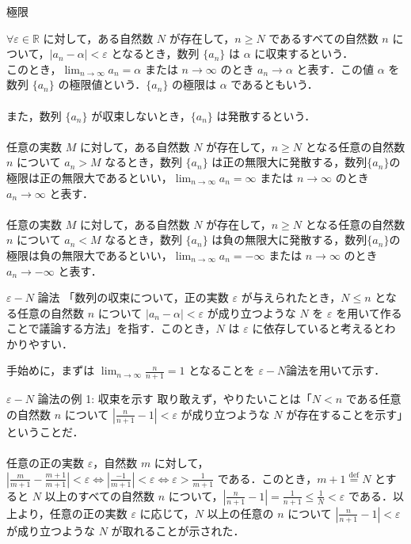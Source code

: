 \documentclass[xelatex,ja=standard,jafont=noto]{bxjsarticle}
\begin{document}
  \begin{tcb}{極限}{}

   $\forall \varepsilon \in \mathbb{R}$ に対して，ある自然数 $N$ が存在して，$n \geq N$ であるすべての自然数 $n$ について，$|a_n - \alpha| < \varepsilon$ となるとき，数列 $\{a_n\}$ は $\alpha$ に収束するという．\\
   このとき，$\lim_{n \to \infty} a_n = \alpha$ または $n \to \infty$ のとき $a_n \to \alpha$ と表す．この値 $\alpha$ を数列 $\{a_n\}$ の極限値という．$\{a_n\}$ の極限は $\alpha$ であるともいう．\\
   \\
   また，数列 $\{a_n\}$ が収束しないとき，$\{a_n\}$ は発散するという．\\
   \\
   任意の実数 $M$ に対して，ある自然数 $N$ が存在して，$n \geq N$ となる任意の自然数 $n$ について $a_n > M$ なるとき，数列 $\{a_n\}$ は正の無限大に発散する，数列$\{a_n\}$の極限は正の無限大であるといい，$\lim_{n \to \infty} a_n = \infty$ または $n \to \infty$ のとき $a_n \to \infty$ と表す．\\
   \\
   任意の実数 $M$ に対して，ある自然数 $N$ が存在して，$n \geq N$ となる任意の自然数 $n$ について $a_n < M$ なるとき，数列 $\{a_n\}$ は負の無限大に発散する，数列$\{a_n\}$の極限は負の無限大であるといい，$\lim_{n \to \infty} a_n = -\infty$ または $n \to \infty$ のとき $a_n \to -\infty$ と表す．

  \end{tcb}

  \begin{tcb}{$\varepsilon - N$ 論法}{}
   「数列の収束について，正の実数 $\varepsilon$ が与えられたとき，$N \leq n$ となる任意の自然数 $n$ について $|a_n - \alpha| < \varepsilon$ が成り立つような $N$ を $\varepsilon$ を用いて作ることで議論する方法」を指す．このとき，$N$ は $\varepsilon$ に依存していると考えるとわかりやすい． 

  \end{tcb}
 手始めに，まずは $\lim_{n \to \infty} \frac{n}{n + 1} = 1$ となることを $\varepsilon - N $論法を用いて示す． 

  \begin{tcb}{$\varepsilon - N$ 論法の例 1: 収束を示す}{}
   取り敢えず，やりたいことは「$N < n$ である任意の自然数 $n$ について $|\frac{n}{n + 1} - 1| < \varepsilon$ が成り立つような $N$ が存在することを示す」ということだ．
   \\
   \\
   任意の正の実数 $\varepsilon$，自然数 $m$ に対して，$|\frac{m}{m + 1} - \frac{m + 1}{m + 1}| < \varepsilon \Leftrightarrow |\frac{-1}{m + 1}| < \varepsilon \Leftrightarrow  \varepsilon  > \frac{1}{m + 1}$ である．このとき，$m + 1 \stackrel{\mathrm{def}}{=} N$ とすると $N$ 以上のすべての自然数 $n$ について，$|\frac{n}{n + 1} - 1| = \frac{1}{n + 1} \leq \frac{1}{N} < \varepsilon$ である．以上より，任意の正の実数 $\varepsilon$ に応じて，$N$ 以上の任意の $n$ について $|\frac{n}{n + 1} - 1| < \varepsilon$ が成り立つような $N$ が取れることが示された．

  \end{tcb}
\end{document}
